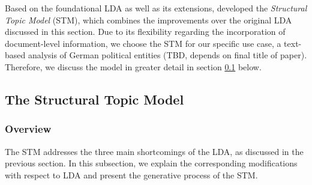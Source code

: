 Based on the foundational LDA as well as its extensions, \cite{roberts2013structural} developed the \textit{Structural Topic Model} (STM), which combines the improvements over the original LDA discussed in this section. Due to its flexibility regarding the incorporation of document-level information, we choose the STM for our specific use case, a text-based analysis of German political entities (TBD, depends on final title of paper). Therefore, we discuss the model in greater detail in section \ref{The Structural Topic Model} below.

\subsection{The Structural Topic Model}
\label{The Structural Topic Model}

\subsubsection*{Overview}

The STM addresses the three main shortcomings of the LDA, as discussed in the previous section. In this subsection, we explain the corresponding modifications with respect to LDA and present the generative process of the STM.

